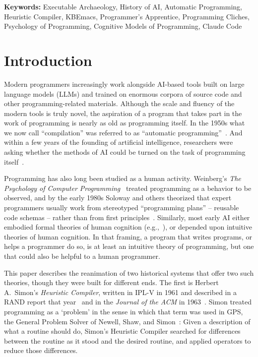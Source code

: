 \documentclass[11pt]{article}
\begin{document}
\noindent\textbf{Keywords:} Executable Archaeology, History of AI,
Automatic Programming, Heuristic Compiler, KBEmacs, Programmer's
Apprentice, Programming Cliches, Psychology of Programming, Cognitive
Models of Programming, Claude Code

\section{Introduction}
\label{sec:intro}

Modern programmers increasingly work alongside AI-based tools built on
large language models (LLMs) and trained on enormous corpora of source
code and other programming-related materials. Although the scale and
fluency of the modern tools is truly novel, the aspiration of a
program that takes part in the work of programming is nearly as old as
programming itself. In the 1950s what we now call ``compilation'' was
referred to as ``automatic
programming''~\cite{backus1957fortran,richwaters1988myths}. And within
a few years of the founding of artificial intelligence, researchers
were asking whether the methods of AI could be turned on the task of
programming itself~\cite{simon1963jacm,balzer1973}.

Programming has also long been studied as a human activity. Weinberg's
\textit{The Psychology of Computer Programming}~\cite{weinberg1971}
treated programming as a behavior to be observed, and by the early
1980s Soloway and others theorized that expert programmers usually
work from stereotyped ``programming plans'' -- reusable code schemas
-- rather than from first principles~\cite{soloway1984}. Similarly,
most early AI either embodied formal theories of human
cognition (e.g.,~\cite{newelletat1958, newell1972hps}), or depended
upon intuitive theories of human cognition. In that framing, a program
that writes programs, or helps a programmer do so, is at least an
intuitive theory of programming, but one that could also be helpful to
a human programmer.

This paper describes the reanimation of two historical systems that
offer two such theories, though they were built for different ends.
The first is Herbert A.~Simon's \emph{Heuristic Compiler}, written in
IPL-V in 1961 and described in a RAND report that
year~\cite{simonP2349} and in the \textit{Journal of the ACM} in
1963~\cite{simon1963jacm}. Simon treated programming as a `problem' in
the sense in which that term was used in GPS, the General Problem
Solver of Newell, Shaw, and Simon~\cite{newell1959gps}: Given a
description of what a routine should do, Simon's Heuristic Compiler
searched for differences between the routine as it stood and the
desired routine, and applied operators to reduce those differences.
\end{document}
